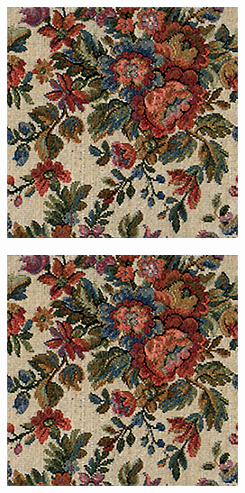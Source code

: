 \begin{figure}[]
\begin{subfigure}{\textwidth}
        \begin{subfigure}{0.24\textwidth}
            \centering
            \includegraphics[width=\textwidth]{images/04-experiment01/flowers/target.jpg}
        \end{subfigure}
        \hfill
        \begin{subfigure}{0.24\textwidth}
            \centering
            \includegraphics[width=\textwidth]{images/04-experiment01/flowers/flowers_bg.jpg}

\end{subfigure}
\end{subfigure}
\end{figure}
